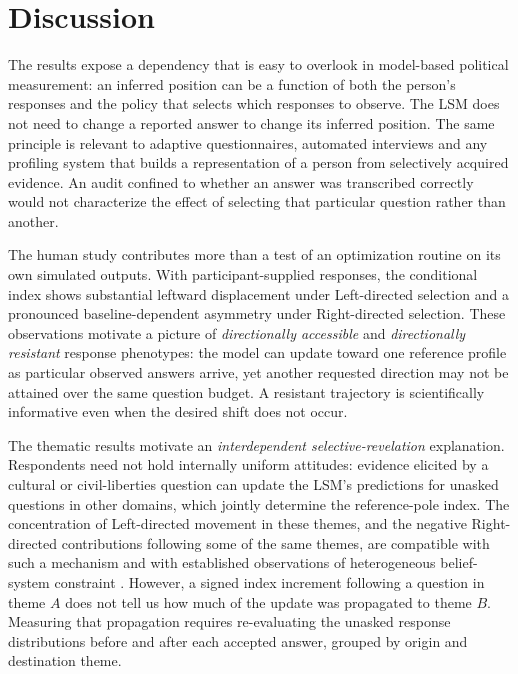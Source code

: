\documentclass[11pt]{article}
\begin{document}
\section*{Discussion}
The results expose a dependency that is easy to overlook in model-based political measurement: an inferred position can be a function of both the person's responses and the policy that selects which responses to observe. The LSM does not need to change a reported answer to change its inferred position. The same principle is relevant to adaptive questionnaires, automated interviews and any profiling system that builds a representation of a person from selectively acquired evidence. An audit confined to whether an answer was transcribed correctly would not characterize the effect of selecting that particular question rather than another.

The human study contributes more than a test of an optimization routine on its own simulated outputs. With participant-supplied responses, the conditional index shows substantial leftward displacement under Left-directed selection and a pronounced baseline-dependent asymmetry under Right-directed selection. These observations motivate a picture of \emph{directionally accessible} and \emph{directionally resistant} response phenotypes: the model can update toward one reference profile as particular observed answers arrive, yet another requested direction may not be attained over the same question budget. A resistant trajectory is scientifically informative even when the desired shift does not occur.

The thematic results motivate an \emph{interdependent selective-revelation} explanation. Respondents need not hold internally uniform attitudes: evidence elicited by a cultural or civil-liberties question can update the LSM's predictions for unasked questions in other domains, which jointly determine the reference-pole index. The concentration of Left-directed movement in these themes, and the negative Right-directed contributions following some of the same themes, are compatible with such a mechanism and with established observations of heterogeneous belief-system constraint \citep{converse1964,baldassarri2008,dellaposta2015}. However, a signed index increment following a question in theme $A$ does not tell us how much of the update was propagated to theme $B$. Measuring that propagation requires re-evaluating the unasked response distributions before and after each accepted answer, grouped by origin and destination theme.
\end{document}
